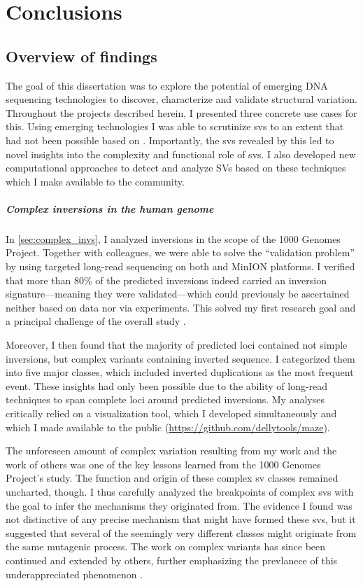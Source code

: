 \chapter{Conclusions}
\label{sec:conclusions}

\section{Overview of findings}
\label{sec:findings}

The goal of this dissertation was to explore the potential of emerging DNA
sequencing technologies to discover, characterize and validate structural
variation. Throughout the projects described herein, I presented three concrete
use cases for this. Using emerging technologies I was able to scrutinize \acp{sv}
to an extent that had not been possible based on \mps. Importantly, the \acp{sv}
revealed by this led to novel insights into the complexity and functional role
of \acp{sv}. I also developed new computational approaches to detect and analyze
SVs based on these techniques which I make available to the community.


\paragraph{Complex inversions in the human genome}
In \cref{sec:complex_invs}, I analyzed inversions in the scope of the 1000
Genomes Project. Together with colleagues, we were able to solve the
``validation problem'' by using targeted long-read sequencing on both \pacbio
and \ont MinION platforms. I verified that more than 80\% of the predicted
inversions indeed carried an inversion signature---meaning they were
validated---which could previously be ascertained neither based on \mps data nor
via \pcr experiments. This solved my first research goal and a principal
challenge of the overall study \citep{Sudmant2015}.

Moreover, I then found that
the majority of predicted loci contained not simple inversions, but complex
variants containing inverted sequence. I categorized them into five major
classes, which included inverted duplications as the most frequent event. These
insights had only been possible due to the ability of long-read techniques to
span complete loci around predicted inversions. My analyses critically relied on
a visualization tool, which I developed simultaneously and which I made
available to the public (\url{https://github.com/dellytools/maze}).

The unforeseen amount of complex variation resulting from my work and the work
of others was one of the key lessons learned from the 1000 Genomes Project's \sv
study. The function and origin of these complex sv classes remained uncharted,
though. I thus carefully analyzed the breakpoints of complex \acp{sv} with the
goal to infer the mechanisms they originated from. The evidence I found was not
distinctive of any precise mechanism that might have formed these \acp{sv}, but
it suggested that several of the seemingly very different classes might
originate from the same mutagenic process. The work on complex variants has
since been continued and extended by others, further emphasizing the prevlanece
of this underappreciated phenomenon \citep{Collins2017}.


